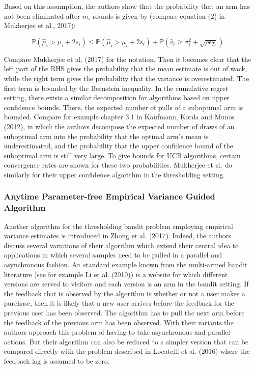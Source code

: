 \documentclass[11pt,]{article}
\begin{document}
Based on this assumption, the authors show that the probability that an
arm has not been eliminated after \(m_i\) rounds is given by (compare
equation (2) in Mukherjee et al., 2017):

\begin{equation} \label{Mukherjee2017Equation2}
\mathbb{P}(\hat{\mu}_i > \mu_i + 2s_i) \leq \mathbb{P} (\hat{\mu}_i > \mu_i + 2\bar{s}_i) + \mathbb{P}(\hat{v}_i \geq \sigma^2_i + \sqrt{\rho \epsilon_{T_i}})
\end{equation}

Compare Mukherjee et al. (2017) for the notation. Then it becomes clear
that the left part of the RHS gives the probability that the mean
estimate is out of wack, while the right term gives the probability that
the variance is overestimated. The first term is bounded by the
Bernstein inequality. In the cumulative regret setting, there exists a
similar decomposition for algorithms based on upper confidence bounds.
There, the expected number of pulls of a suboptimal arm is bounded.
Compare for example chapter 3.1 in Kaufmann, Korda and Munos (2012), in
which the authors decompose the expected number of draws of an
suboptimal arm into the probability that the optimal arm's mean is
underestimated, and the probability that the upper confidence bound of
the suboptimal arm is still very large. To give bounds for UCB
algorithms, certain convergence rates are shown for these two
probabilities. Mukherjee et al. do similarly for their upper confidence
algorithm in the thresholding setting.

\subsubsection{\texorpdfstring{Anytime Parameter-free Empirical Variance
Guided Algorithm
\label{sec:EVTAlgorithm}}{Anytime Parameter-free Empirical Variance Guided Algorithm }}\label{anytime-parameter-free-empirical-variance-guided-algorithm}

Another algorithm for the thresholding bandit problem employing
empirical variance estimates is introduced in Zhong et al. (2017).
Indeed, the authors discuss several variations of their algorithm which
extend their central idea to applications in which several samples need
to be pulled in a parallel and asynchronous fashion. An standard example
known from the multi-armed bandit literature (see for example Li et al.
(2010)) is a website for which different versions are served to visitors
and each version is an arm in the bandit setting. If the feedback that
is observed by the algorithm is whether or not a user makes a purchase,
then it is likely that a new user arrives before the feedback for the
previous user has been observed. The algorithm has to pull the next arm
before the feedback of the previous arm has been observed. With their
variants the authors approach this problem of having to take
asynchronous and parallel actions. But their algorithm can also be
reduced to a simpler version that can be compared directly with the
problem described in Locatelli et al. (2016) where the feedback lag is
assumed to be zero.
\end{document}
